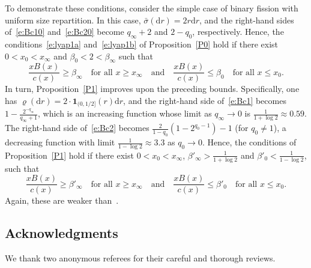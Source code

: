 \documentclass[11pt]{article}
\theoremstyle{definition}
\providecommand{\mathof}[1]{\mathrm{#1}}
\numberwithin{equation}{section}
\numberwithin{figure}{section}
\numberwithin{table}{section}
\newcommand\dd{\mathof{d}}
\begin{document}
To demonstrate these conditions, consider the simple case of binary fission with uniform size repartition. In this case, $\bar \sigma(\dd r) = 2r \dd r $, and the right-hand sides of~\eqref{e:Bc10} and~\eqref{e:Bc20} become $q_{\infty}+2$ and $2-q_0$, respectively. Hence, the conditions~\eqref{e:lyap1a} and~\eqref{e:lyap1b} of Proposition~\ref{P0} hold if there exist $0<x_0<x_{\infty}$ and $\beta_0<2<\beta_{\infty}$ such that
\[
\frac{x B(x)}{c(x)} \geq \beta_{\infty} \quad \text{for all } x \ge x_\infty
\quad \text{and} \quad
\frac{x B(x)}{c(x)} \leq \beta_0 \quad \text{for all }x \le x_0.
\]
In turn, Proposition~\ref{P1} improves upon the preceding bounds. Specifically, one has $\varrho(\dd r) = 2\cdot {\mathbf 1}_{(0,1/2]}(r) \dd r$, and the right-hand side of~\eqref{e:Bc1} becomes $1-\frac{2^{-q_\infty}}{q_\infty+1}$, which is an increasing function whose limit as $q_\infty\to 0$ is $\frac{1}{1+\log 2} \approx 0.59$. The right-hand side of~\eqref{e:Bc2} becomes $\frac{2}{1-q_0}(1-2^{q_0-1})-1$ (for $q_0\ne 1$), a decreasing function with limit $\frac{1}{1-\log 2} \approx 3.3$ as $q_0\to 0$. Hence, the conditions of Proposition~\ref{P1} hold if there exist $0<x_0<x_{\infty}$, $\beta'_{\infty}>\frac{1}{1+\log 2}$ and $\beta'_0<\frac{1}{1-\log 2}$, such that
\[
\frac{x B(x)}{c(x)} \geq \beta'_{\infty} \quad \text{for all } x \ge x_\infty
\quad \text{and} \quad
\frac{x B(x)}{c(x)} \leq \beta'_0 \quad \text{for all }x \le x_0.
\]
Again, these are weaker than~\cite[Conditions (12) and (13)]{DoumGab}.

\subsection*{Acknowledgments}
We thank two anonymous referees for their careful and thorough reviews.
\end{document}
